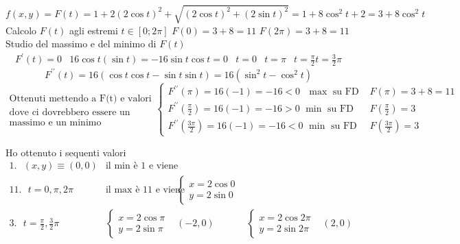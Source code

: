 \begin{esempio}
\begin{enumerate}
\begin{equation*}
				f(x,y)=F(t)=1+2(2\cos t)^2+\sqrt{(2\cos t)^2+(2\sin t)^2} =
				1+8\cos^2t+2 = 3+8\cos^2t
			\end{equation*}
			Calcolo $F(t)$ agli estremi $t\in[0;2\pi]$ $F(0)=3+8=11$
			$F(2\pi)=3+8=11$\\
			Studio del massimo e del minimo di $F(t)$
			\begin{equation*}
				\begin{matrix}
					F^\prime(t)=0 & 16\cos t(\sin t)=-16\sin t\cos t =0 & t=0&
					t=\pi & t=\frac{\pi}{2}t=\frac{3}{2} \pi
				\end{matrix}
			\end{equation*}
			\begin{equation*}
				F^{\prime\prime}(t)=16(\cos t \cos t -\sin t \sin t) =16(\sin^2
				t- \cos^2 t)
			\end{equation*}
			\begin{equation*}
				\begin{matrix}
					\text{Ottenuti mettendo a F(t) e valori}\\
					\text{dove ci dovrebbero essere un}\\
					\text{massimo e un minimo}
				\end{matrix} \begin{cases}
					F^{\prime\prime}(\pi)=16(-1)=-16<0\text{ }\max\text{ su FD
					}&
					F(\pi) =3+8=11\\
					F^{\prime\prime}(\frac{\pi}{2})=16(-1)=-16>0\text{
					}\min\text{ su
					FD }& F(\frac{\pi}{2}) =3\\
					F^{\prime\prime}(\frac{3\pi}{2})=16(-1)=-16<0\text{
					}\min\text{ su
					FD }& F(\frac{3\pi}{2}) =3
				\end{cases}
			\end{equation*}
	\end{enumerate}
	Ho ottenuto i sequenti valori
	\begin{equation*}
		\begin{matrix}
			1.\text{ }(x,y) \equiv (0,0) & \text{il }\min \text{ è 1 e viene assunto in
			(0,0)} \\
			11.\text{ }t=0,\pi,2\pi & \text{il } \max \text{ è 11 e viene
			assunti in }&
			\begin{cases}
				x=2\cos 0\\
				y=2\sin 0
			\end{cases}\\
			3.\text{ }t=\frac{\pi}{2}, \frac{3}{2}\pi & \begin{cases}
				x=2\cos \pi \\
				y=2\sin \pi
			\end{cases} & (-2,0) & \begin{cases}
				x=2\cos 2\pi \\
				y=2\sin 2\pi
			\end{cases} & (2,0)
		\end{matrix}
	\end{equation*}
\end{esempio}
